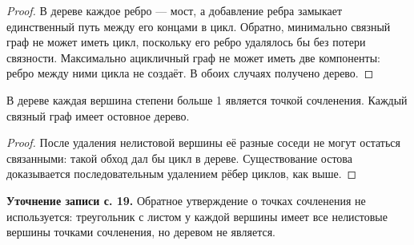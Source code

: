 \begin{proof}
В дереве каждое ребро — мост, а добавление ребра замыкает единственный
путь между его концами в цикл. Обратно, минимально связный граф не может
иметь цикл, поскольку его ребро удалялось бы без потери связности.
Максимально ацикличный граф не может иметь две компоненты: ребро между
ними цикла не создаёт. В обоих случаях получено дерево.
\end{proof}


\begin{cor}
В дереве каждая вершина степени больше 1 является точкой сочленения.
Каждый связный граф имеет остовное дерево.
\end{cor}
\begin{proof}
После удаления нелистовой вершины её разные соседи не могут остаться
связанными: такой обход дал бы цикл в дереве. Существование остова
доказывается последовательным удалением рёбер циклов, как выше.
\end{proof}
\textbf{Уточнение записи с. 19.} Обратное утверждение о точках сочленения
не используется: треугольник с листом у каждой вершины имеет все нелистовые
вершины точками сочленения, но деревом не является.
